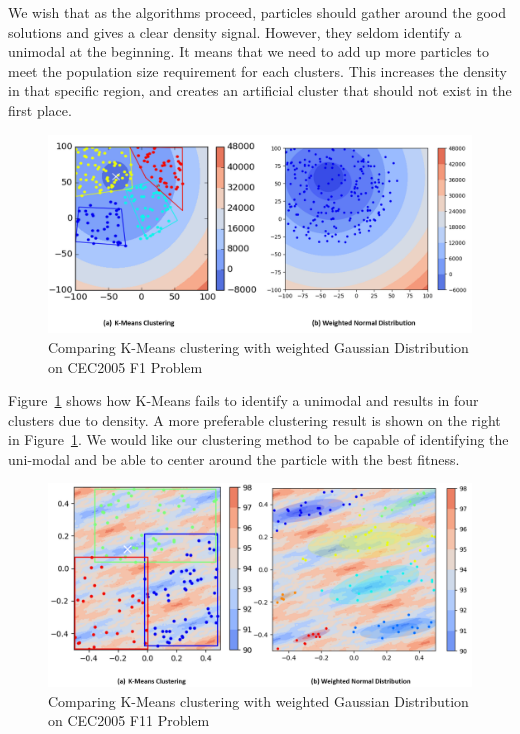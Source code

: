 We wish that as the algorithms proceed, particles should gather around the good solutions and gives a clear density signal.
However, they seldom identify a unimodal at the beginning.
It means that we need to add up more particles to meet the population size requirement for each clusters.
This increases the density in that specific region, and creates an artificial cluster that should not exist in the first place.

\begin{figure} 
\centering
\includegraphics[width=\textwidth]{Clustering_comparison} 
\caption{Comparing K-Means clustering with weighted Gaussian Distribution on CEC2005 F1 Problem}\label{fig:Clustering_comparison}
\end{figure}

Figure~\ref{fig:Clustering_comparison} shows how K-Means fails to identify a unimodal and results in four clusters due to density.
A more preferable clustering result is shown on the right in Figure~\ref{fig:Clustering_comparison}.
We would like our clustering method to be capable of identifying the uni-modal 
and be able to center around the particle with the best fitness.

\begin{figure}
\centering
\includegraphics[width=\textwidth]{Clustering_comparison_F11}
\caption{Comparing K-Means clustering with weighted Gaussian Distribution on CEC2005 F11 Problem}\label{fig:Clustering_comparison_F11}
\end{figure}

